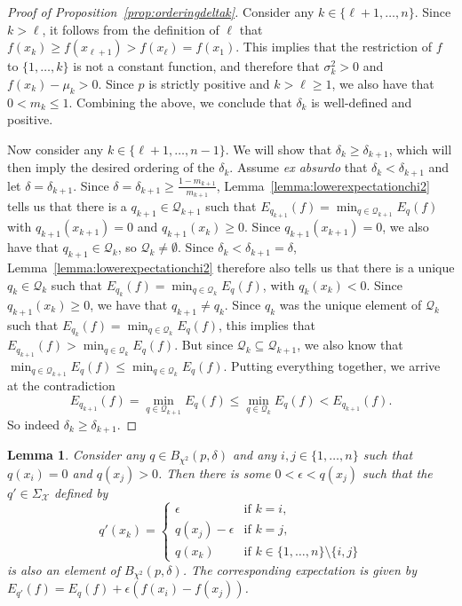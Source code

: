 \documentclass{article}
\newtheorem{lemma}{Lemma}
\begin{document}
\begin{proof}[Proof of Proposition~\ref{prop:orderingdeltak}]
Consider any $k\in\{\ell+1,\ldots,n\}$. Since $k>\ell$, it follows from the definition of $\ell$ that $f(x_k)\geq f(x_{\ell+1})>f(x_\ell)=f(x_1)$. This implies that the restriction of $f$ to $\{1,\ldots,k\}$ is not a constant function, and therefore that $\sigma_k^2>0$ and $f(x_k)-\mu_k>0$.
Since $p$ is strictly positive and $k>\ell\geq1$, we also have that $0<m_k\leq1$. Combining the above, we conclude that $\delta_k$ is well-defined and positive.

Now consider any $k\in\{\ell+1,\ldots,n-1\}$. We will show that $\delta_k\geq\delta_{k+1}$, which will then imply the desired ordering of the $\delta_k$. Assume \emph{ex absurdo} that $\delta_k<\delta_{k+1}$ and let $\delta=\delta_{k+1}$. Since $\delta=\delta_{k+1}\geq\frac{1-m_{k+1}}{m_{k+1}}$, Lemma~\ref{lemma:lowerexpectationchi2} tells us that there is a $q_{k+1}\in\mathcal{Q}_{k+1}$ such that $E_{q_{k+1}}(f)=\min_{q\in\mathcal{Q}_{k+1}}E_q(f)$ with $q_{k+1}(x_{k+1})=0$ and $q_{k+1}(x_k)\geq0$. Since $q_{k+1}(x_{k+1})=0$, we also have that $q_{k+1}\in\mathcal{Q}_k$, so $\mathcal{Q}_k\neq\emptyset$. Since $\delta_k<\delta_{k+1}=\delta$, Lemma~\ref{lemma:lowerexpectationchi2} therefore also tells us that there is a unique $q_k\in\mathcal{Q}_k$ such that $E_{q_k}(f)=\min_{q\in\mathcal{Q}_k} E_q(f)$, with $q_k(x_k)<0$. Since $q_{k+1}(x_k)\geq0$, we have that $q_{k+1}\neq q_k$. Since $q_k$ was the unique element of $\mathcal{Q}_k$ such that $E_{q_k}(f)=\min_{q\in\mathcal{Q}_k} E_q(f)$, this implies that $E_{q_{k+1}}(f)>\min_{q\in\mathcal{Q}_k} E_q(f)$. But since $\mathcal{Q}_k\subseteq\mathcal{Q}_{k+1}$, we also know that $\min_{q\in\mathcal{Q}_{k+1}} E_q(f)\leq\min_{q\in\mathcal{Q}_k} E_q(f)$. Putting everything together, we arrive at the contradiction
\begin{equation*}
E_{q_{k+1}}(f)=\min_{q\in\mathcal{Q}_{k+1}} E_q(f)\leq\min_{q\in\mathcal{Q}_k} E_q(f)<E_{q_{k+1}}(f).
\end{equation*}
So indeed $\delta_k\geq\delta_{k+1}$.
\end{proof}

\begin{lemma}\label{lemma:movemasschi2}
Consider any $q\in B_{\chi^2}(p,\delta)$ and any $i,j\in\{1,\ldots,n\}$ such that $q(x_i)=0$ and $q(x_j)>0$. Then there is some $0<\epsilon<q(x_j)$ such that the $q'\in\Sigma_\mathcal{X}$ defined by 
\begin{equation*}
q'(x_k)=
\begin{cases}
\epsilon & \text{if } k=i,\\
q(x_j)-\epsilon & \text{if } k=j,\\
q(x_k) & \text{if } k\in\{1,\ldots,n\}\setminus\{i,j\}
\end{cases}
\end{equation*}
is also an element of $B_{\chi^2}(p,\delta)$. The corresponding expectation is given by $E_{q'}(f)=E_q(f)+\epsilon(f(x_i)-f(x_j))$.
\end{lemma}
\end{document}
